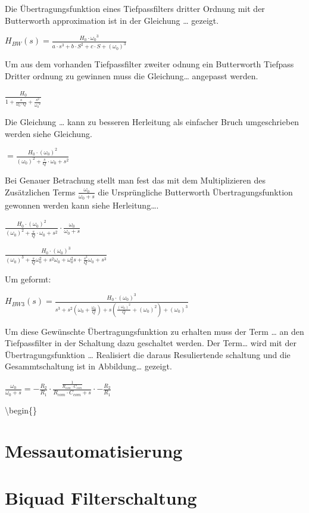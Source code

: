 \documentclass[
  ngerman,
  letterpaper,
  DIV=11]{scrreprt}
\begin{document}
Die Übertragungsfunktion eines Tiefpassfilters dritter Ordnung mit der
Butterworth approximation ist in der Gleichung \ldots{} gezeigt.

\(H_{BW}(s) = \frac{H_0 \cdot {\omega_0}^3}{a\cdot s^3 +b\cdot S^2 +c \cdot S + (\omega_0)^3}\)

Um aus dem vorhanden Tiefpassfilter zweiter odnung ein Butterworth
Tiefpass Dritter ordnung zu gewinnen muss die Gleichung\ldots{}
angepasst werden.

\(\frac{H_0}{1+\frac{s}{\omega_0 \cdot Q} + \frac{s^2}{{\omega_0}^2}}\)

Die Gleichung \ldots{} kann zu besseren Herleitung als einfacher Bruch
umgeschrieben werden siehe Gleichung.

\(= \frac{H_0 \cdot (\omega_0)^2}{(\omega_0)^2+\frac{s}{Q} \cdot \omega_0 +s^2}\)

Bei Genauer Betrachung stellt man fest das mit dem Multiplizieren des
Zusätzlichen Terms \(\frac{\omega_0}{\omega_0 + s}\) die Ursprüngliche
Butterworth Übertragungsfunktion gewonnen werden kann siehe
Herleitung\ldots.

\(\frac{H_0 \cdot (\omega_0)^2}{(\omega_0)^2+\frac{s}{Q} \cdot \omega_0 +s^2} \cdot \frac{\omega_0}{\omega_0 + s}\)

\(\frac{H_0 \cdot (\omega_0)^3} {(\omega_0)^3 + \frac{s}{Q}\omega_0^2+s^2\omega_0+\omega_0^2s + \frac{s^2}{Q}\omega_0 + s^3}\)

Um geformt:

\(H_{BW3}(s) = \frac{H_0 \cdot (\omega_0)^3}{s^3 + s^2(\omega_0+\frac{\omega_0}{Q})+s(\frac{(\omega_0)^2}{Q}+(\omega_0)^2) +(\omega_0)^3}\)

Um diese Gewünschte Übertragungsfunktion zu erhalten muss der Term
\ldots{} an den Tiefpassfilter in der Schaltung dazu geschaltet werden.
Der Term\ldots{} wird mit der Übertragungsfunktion \ldots{} Realisiert
die daraus Resuliertende schaltung und die Gesammtschaltung ist in
Abbildung\ldots{} gezeigt.

\(\frac{\omega_0}{\omega_0 +s} = -\frac{R_2}{R_1} \cdot \frac{\frac{1}{R_{com} \cdot C_{com}}}{R_{com} \cdot C_{com} +s} \cdot -\frac{R_2}{R_1}\)

\textbackslash begin\{\}

\chapter{Messautomatisierung}\label{messautomatisierung}

\chapter{Biquad Filterschaltung}\label{biquad-filterschaltung}
\end{document}
